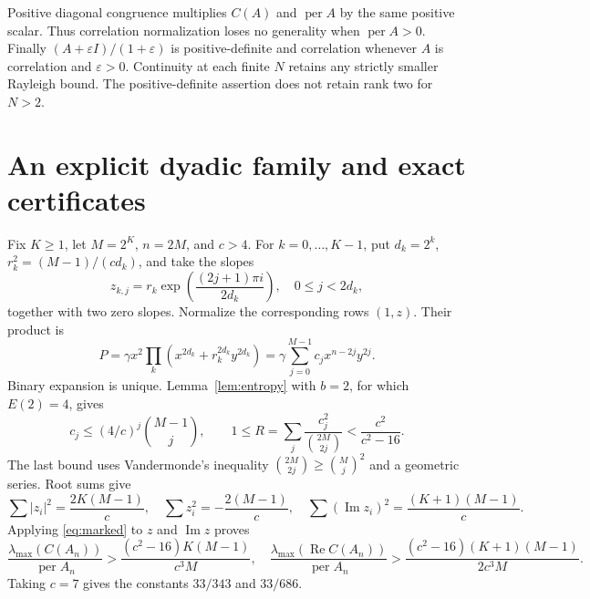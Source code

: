 \documentclass[11pt]{article}
\DeclareMathOperator{\per}{per}
\DeclareMathOperator{\Ree}{Re}
\DeclareMathOperator{\Imm}{Im}
\begin{document}
Positive diagonal congruence multiplies $C(A)$ and $\per A$ by the same
positive scalar. Thus correlation normalization loses no generality when
$\per A>0$. Finally $(A+\varepsilon I)/(1+\varepsilon)$ is positive-definite
and correlation whenever $A$ is correlation and $\varepsilon>0$. Continuity
at each finite $N$ retains any strictly smaller Rayleigh bound. The
positive-definite assertion does not retain rank two for $N>2$.

\section{An explicit dyadic family and exact certificates}
Fix $K\ge1$, let $M=2^K$, $n=2M$, and $c>4$. For $k=0,\ldots,K-1$, put
$d_k=2^k$, $r_k^2=(M-1)/(cd_k)$, and take the slopes
\[
 z_{k,j}=r_k\exp\left(\frac{(2j+1)\pi i}{2d_k}\right),
 \quad0\le j<2d_k,
\]
together with two zero slopes. Normalize the corresponding rows $(1,z)$.
Their product is
\[
 P=\gamma x^2\prod_k(x^{2d_k}+r_k^{2d_k}y^{2d_k})
  =\gamma\sum_{j=0}^{M-1}c_jx^{n-2j}y^{2j}.
\]
Binary expansion is unique. Lemma~\ref{lem:entropy} with $b=2$, for which
$E(2)=4$, gives
\[
 c_j\le(4/c)^j\binom{M-1}{j},\qquad
 1\le R=\sum_j\frac{c_j^2}{\binom{2M}{2j}}
     <\frac{c^2}{c^2-16}.
\]
The last bound uses Vandermonde's inequality
$\binom{2M}{2j}\ge\binom Mj^2$ and a geometric series. Root sums give
\[
 \sum|z_i|^2=\frac{2K(M-1)}c,\quad
 \sum z_i^2=-\frac{2(M-1)}c,\quad
 \sum(\Imm z_i)^2=\frac{(K+1)(M-1)}c.
\]
Applying \eqref{eq:marked} to $z$ and $\Imm z$ proves
\begin{equation}\label{eq:dyadic}
 \frac{\lambda_{\max}(C(A_n))}{\per A_n}
 >\frac{(c^2-16)K(M-1)}{c^3M},\quad
 \frac{\lambda_{\max}(\Ree C(A_n))}{\per A_n}
 >\frac{(c^2-16)(K+1)(M-1)}{2c^3M}.
\end{equation}
Taking $c=7$ gives the constants $33/343$ and $33/686$.
\end{document}
